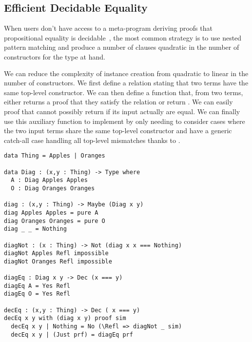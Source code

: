
\subsection{Efficient Decidable Equality}
\label{sec:idioms:decEq}

When users don't have access to a meta-program deriving proofs that propositional
equality is decidable~\cite{DBLP:conf/icfp/ChristiansenB16},
the most common strategy is to use nested pattern matching and produce
a number of clauses quadratic in the number of constructors for the type at hand.



We can reduce the complexity of  instance creation from quadratic
to linear in the number of constructors.
%
We first define a  relation stating that two terms have the same
top-level constructor.
%
We can then define a  function that, from two terms, either returns
a proof that they satisfy the  relation or return .
%
We can easily proof that  cannot possibly return 
if its input actually are equal.
%
We can finally use this auxiliary function to implement 
by only needing to consider cases where the two input terms share the same
top-level constructor and have a generic catch-all case handling all top-level
mismatches thanks to .



\begin{verbatim}
data Thing = Apples | Oranges

data Diag : (x,y : Thing) -> Type where
  A : Diag Apples Apples
  O : Diag Oranges Oranges

diag : (x,y : Thing) -> Maybe (Diag x y)
diag Apples Apples = pure A
diag Oranges Oranges = pure O
diag _ _ = Nothing

diagNot : (x : Thing) -> Not (diag x x === Nothing)
diagNot Apples Refl impossible
diagNot Oranges Refl impossible

diagEq : Diag x y -> Dec (x === y)
diagEq A = Yes Refl
diagEq O = Yes Refl

decEq : (x,y : Thing) -> Dec ( x === y)
decEq x y with (diag x y) proof sim
  decEq x y | Nothing = No (\Refl => diagNot _ sim)
  decEq x y | (Just prf) = diagEq prf
\end{verbatim}

